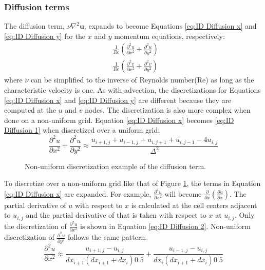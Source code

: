 \subsubsection{Diffusion terms}
\label{sec:NS ID Diffusion}
The diffusion term, $\nu \nabla^2 \textbf{u}$, expands to become Equations \eqref{eq:ID Diffusion x} and \eqref{eq:ID Diffusion y} for the $x$ and $y$ momentum equations, respectively:
\begin{align}
& \frac{1}{Re}\left(\frac{\partial^2 u}{\partial x^2} + \frac{\partial^2 u}{\partial y^2}\right)\label{eq:ID Diffusion x} \\
& \frac{1}{Re}\left(\frac{\partial^2 v}{\partial x^2} + \frac{\partial^2 v}{\partial y^2}\right)\; \label{eq:ID Diffusion y}
\end{align}
where $\nu$ can be simplified to the inverse of Reynolds number(Re) as long as the characteristic velocity is one. 
As with advection, the discretizations for Equations \eqref{eq:ID Diffusion x} and \eqref{eq:ID Diffusion y} are different because they are computed at the $u$ and $v$ nodes. 
The discretization is also more complex when done on a non-uniform grid.
Equation \eqref{eq:ID Diffusion x} becomes \eqref{eq:ID Diffusion 1} when discretized over a uniform grid: 
\begin{equation}
\frac{\partial^2 u}{\partial x^2} + \frac{\partial^2 u}{\partial y^2}\approx\frac{u_{i+1,j} + u_{i-1,j} + u_{i,j+1} + u_{i,j-1} - 4u_{i,j}}{\Delta^2}\label{eq:ID Diffusion 1}
\end{equation}
\begin{figure}[!htb]
	\centering
	
	\caption{Non-uniform discretization example of the diffusion term.}
	\label{fig:ID diffusion}
\end{figure}
To discretize over a non-uniform grid like that of Figure \ref{fig:ID diffusion}, the terms in Equation \eqref{eq:ID Diffusion x} are expanded. 
For example, $\frac{\partial^2 u}{\partial x^2}$ will become $\frac{\partial}{\partial x}\left(\frac{\partial u}{\partial x}\right)$. 
The partial derivative of $u$ with respect to $x$ is calculated at the cell centers adjacent to $u_{i,j}$ and the partial derivative of that is taken with respect to $x$ at $u_{i,j}.$
Only the discretization of $\frac{\partial^2 u}{\partial x^2}$ is shown in Equation \eqref{eq:ID Diffusion 2}. 
Non-uniform discretization of $\frac{\partial^2 u}{\partial y^2}$ follows the same pattern. 
\begin{equation}
\frac{\partial^2 u}{\partial x^2}\approx\frac{u_{i+1,j} - u_{i,j}}{dx_{i+1}(dx_{i+1}+dx_i)0.5} + \frac{u_{i-1,j} - u_{i,j}}{dx_{i}(dx_{i+1}+dx_i)0.5}  \label{eq:ID Diffusion 2}
\end{equation}

